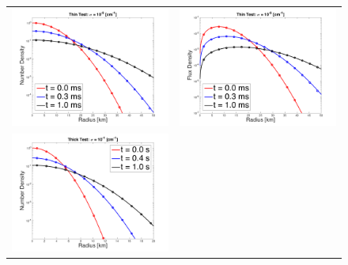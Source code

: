\documentclass[11pt,letterpaper,twoside,english,final]{article}
\begin{document}
\begin{figure}[h]
  \centering
  \begin{tabular}{cc}
    \includegraphics[scale=0.38]{./Figures/GaussianSphericalDiffusion_Kappa_1e-5_Density} &
    \includegraphics[scale=0.38]{./Figures/GaussianSphericalDiffusion_Kappa_1e-5_Flux} \\
    \includegraphics[scale=0.38]{./Figures/GaussianSphericalDiffusion_Kappa_1e-1_Density} &

\end{tabular}
\end{figure}
\end{document}
